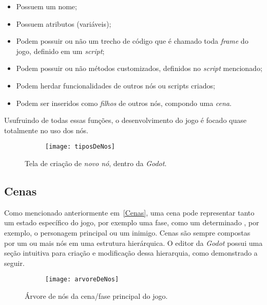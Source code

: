 \begin{itemize}
    \item Possuem um nome;
    \item Possuem atributos (variáveis);
    \item Podem possuir ou não um trecho de código que é chamado toda \textit{frame} do jogo, definido em um \textit{script};
    \item Podem possuir ou não métodos customizados, definidos no \textit{script} mencionado;
    \item Podem herdar funcionalidades de outros nós ou scripts criados;
    \item Podem ser inseridos como \textit{filhos} de outros nós, compondo uma \textit{cena}.
\end{itemize}

Usufruindo de todas essas funções, o desenvolvimento do jogo é focado quase totalmente no uso dos nós.

\begin{figure}
    \centering

    \begin{subfigure}{.9\textwidth}
        \centering
        \texttt{[image: tiposDeNos]}
    \end{subfigure}

    \caption{Tela de criação de \textit{novo nó}, dentro da \textit{Godot}.}
\end{figure}

\subsection{Cenas}

Como mencionado anteriormente em~\ref{Cenas}, uma cena pode representar tanto um estado específico do jogo, por exemplo uma fase, como um determinado \textquotedbl{}, por exemplo, o personagem principal ou um inimigo. Cenas são sempre compostas por um ou mais nós em uma estrutura hierárquica. O editor da \textit{Godot} possui uma seção intuitiva para criação e modificação dessa hierarquia, como demonstrado a seguir.

\begin{figure}
    \centering

    \begin{subfigure}{.4\textwidth}
        \centering
        \texttt{[image: arvoreDeNos]}
    \end{subfigure}

    \caption{Árvore de nós da cena/fase principal do jogo.}
\end{figure}

